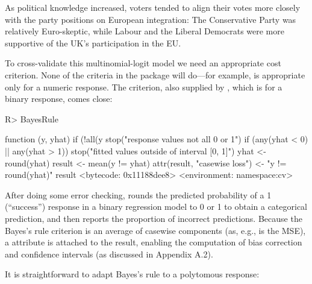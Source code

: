 \documentclass[
]{jss}
\begin{document}
As political knowledge increased, voters tended to align their votes
more closely with the party positions on European integration: The
Conservative Party was relatively Euro-skeptic, while Labour and the
Liberal Democrats were more supportive of the UK's participation in the
EU.

To cross-validate this multinomial-logit model we need an appropriate
cost criterion. None of the criteria in the  package will
do---for example,  is appropriate only for a numeric
response. The  criterion, also supplied by ,
which is for a binary response, comes close:

\begin{CodeChunk}
\begin{CodeInput}
R> BayesRule
\end{CodeInput}
\begin{CodeOutput}
function (y, yhat)
{
    if (!all(y %
        stop("response values not all 0 or 1")
    if (any(yhat < 0) || any(yhat > 1))
        stop("fitted values outside of interval [0, 1]")
    yhat <- round(yhat)
    result <- mean(y != yhat)
    attr(result, "casewise loss") <- "y != round(yhat)"
    result
}
<bytecode: 0x11188dee8>
<environment: namespace:cv>
\end{CodeOutput}
\end{CodeChunk}

After doing some error checking,  rounds the predicted
probability  of a 1 (``success'') response in a binary
regression model to 0 or 1 to obtain a categorical prediction, and then
reports the proportion of incorrect predictions. Because the Bayes's
rule criterion is an average of casewise components (as, e.g., is the
MSE), a  attribute is attached to the result,
enabling the computation of bias correction and confidence intervals (as
discussed in Appendix A.2).

It is straightforward to adapt Bayes's rule to a polytomous response:
\end{document}
